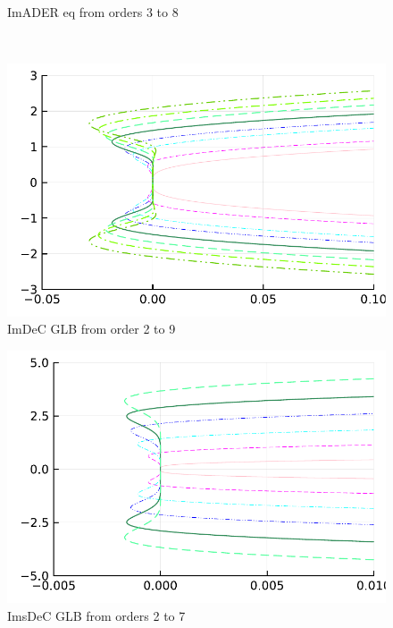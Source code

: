 \begin{figure}
\begin{minipage}[t]{0.325\textwidth}
		\centering
		ImADER eq from orders 3 to 8
	\end{minipage}\\[2mm]
	\begin{minipage}[t]{0.325\textwidth}
		\includegraphics[width=\textwidth]{pdf/odepics/IMEXDeC_gaussLobatto_zoom.pdf}
		\centering
		ImDeC GLB from order 2 to 9
	\end{minipage}	
	\begin{minipage}[t]{0.325\textwidth}
		\includegraphics[width=\textwidth,trim={0 0 3 0}, clip]{pdf/odepics/IMEXDeC_subtimesteps_gaussLobatto_zoom.pdf}
		\centering
		ImsDeC GLB from orders 2 to 7
	\end{minipage}
	\begin{minipage}[t]{0.325\textwidth}

\end{minipage}
\end{figure}
